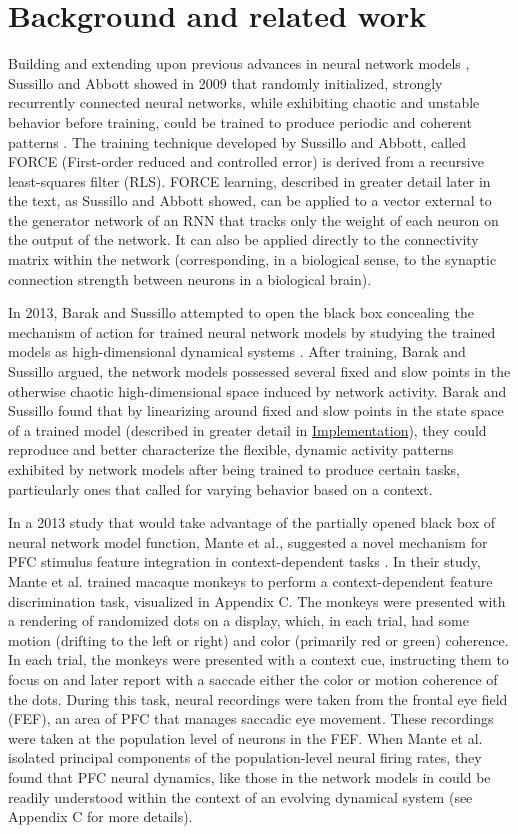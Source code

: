 \documentclass[12pt,a4paper,final]{iopart}
\begin{document}
\section{Background and related work}
\label{sec:back}
Building and extending upon previous advances in neural network models \cite{Jaeger}, Sussillo and Abbott showed in 2009 that randomly initialized, strongly recurrently connected neural networks, while exhibiting chaotic and unstable behavior before training, could be trained to produce periodic and coherent patterns \cite{Sussillo}. The training technique developed by Sussillo and Abbott, called FORCE (First-order reduced and controlled error) is derived from a recursive least-squares filter (RLS). FORCE learning, described in greater detail later in the text, as Sussillo and Abbott showed, can be applied to a vector external to the generator network of an RNN that tracks only the weight of each neuron on the output of the network. It can also be applied directly to the connectivity matrix within the network (corresponding, in a biological sense, to the synaptic connection strength between neurons in a biological brain). 

In 2013, Barak and Sussillo attempted to open the black box concealing the mechanism of action for trained neural network models by studying the trained models as high-dimensional dynamical systems \cite{BarakSussillo}. After training, Barak and Sussillo argued, the network models possessed several fixed and slow points in the otherwise chaotic high-dimensional space induced by network activity. Barak and Sussillo found that by linearizing around fixed and slow points in the state space of a trained model (described in greater detail in \hyperref[sec:imp]{Implementation}), they could reproduce and better characterize the flexible, dynamic activity patterns exhibited by network models after being trained to produce certain tasks, particularly ones that called for varying behavior based on a context.

In a 2013 study that would take advantage of the partially opened black box of neural network model function, Mante et al., suggested a novel mechanism for PFC stimulus feature integration in context-dependent tasks \cite{Mante2013}. In their study, Mante et al. trained macaque monkeys to perform a context-dependent feature discrimination task, visualized in Appendix C. The monkeys were presented with a rendering of randomized dots on a display, which, in each trial, had some motion (drifting to the left or right) and color (primarily red or green) coherence. In each trial, the monkeys were presented with a context cue, instructing them to focus on and later report with a saccade either the color or motion coherence of the dots. During this task, neural recordings were taken from the frontal eye field (FEF), an area of PFC that manages saccadic eye movement. These recordings were taken at the population level of neurons in the FEF. When Mante et al. isolated principal components of the population-level neural firing rates, they found that PFC neural dynamics, like those in the network models in \cite{BarakSussillo} could be readily understood within the context of an evolving dynamical system (see Appendix C for more details).
\end{document}
